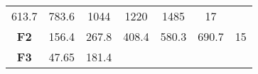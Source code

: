 \documentclass[12pt,a4paper]{article}
\begin{document}
\begin{longtable}[c]{@{}ccccccc@{}}
\begin{minipage}[t]{0.08\columnwidth}\centering\strut
613.7
\strut\end{minipage} &
\begin{minipage}[t]{0.08\columnwidth}\centering\strut
783.6
\strut\end{minipage} &
\begin{minipage}[t]{0.09\columnwidth}\centering\strut
1044
\strut\end{minipage} &
\begin{minipage}[t]{0.10\columnwidth}\centering\strut
1220
\strut\end{minipage} &
\begin{minipage}[t]{0.11\columnwidth}\centering\strut
1485
\strut\end{minipage} &
\begin{minipage}[t]{0.07\columnwidth}\centering\strut
17
\strut\end{minipage}\tabularnewline
\begin{minipage}[t]{0.11\columnwidth}\centering\strut
\textbf{F2}
\strut\end{minipage} &
\begin{minipage}[t]{0.08\columnwidth}\centering\strut
156.4
\strut\end{minipage} &
\begin{minipage}[t]{0.08\columnwidth}\centering\strut
267.8
\strut\end{minipage} &
\begin{minipage}[t]{0.09\columnwidth}\centering\strut
408.4
\strut\end{minipage} &
\begin{minipage}[t]{0.10\columnwidth}\centering\strut
580.3
\strut\end{minipage} &
\begin{minipage}[t]{0.11\columnwidth}\centering\strut
690.7
\strut\end{minipage} &
\begin{minipage}[t]{0.07\columnwidth}\centering\strut
15
\strut\end{minipage}\tabularnewline
\begin{minipage}[t]{0.11\columnwidth}\centering\strut
\textbf{F3}
\strut\end{minipage} &
\begin{minipage}[t]{0.08\columnwidth}\centering\strut
47.65
\strut\end{minipage} &
\begin{minipage}[t]{0.08\columnwidth}\centering\strut
181.4
\strut\end{minipage} &

\end{longtable}
\end{document}
